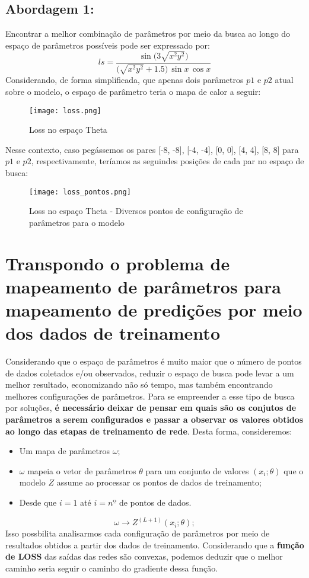 \documentclass{article}
\begin{document}
\subsection{Abordagem 1:}
Encontrar a melhor combinação de parâmetros por meio da busca ao longo do espaço de parâmetros possíveis pode ser expressado por:
\[
ls = \frac{\sin\bigl(3\sqrt{x^2 y^2}\bigr)}{\bigl(\sqrt{x^2 y^2} + 1.5\bigr)\,\sin x \,\cos x}
\]
Considerando, de forma simplificada, que apenas dois parâmetros $p1$ e $p2$ atual sobre o modelo, o espaço de parâmetro teria o mapa de calor a seguir:
\begin{figure}[H]
    \centering
    \texttt{[image: loss.png]}
    \caption{Loss no espaço Theta}
    \label{fig:enter-label}
\end{figure}
Nesse contexto, caso pegássemos os pares [-8, -8], [-4, -4], [0, 0], [4, 4], [8, 8] para $p1$ e $p2$, respectivamente, teríamos as seguindes posições de cada par no espaço de busca: 
\begin{figure}[H]
    \centering
    \texttt{[image: loss\_pontos.png]}
    \caption{Loss no espaço Theta - Diversos pontos de configuração de parâmetros para o modelo}
    \label{fig:enter-label}
\end{figure}
\section{Transpondo o problema de mapeamento de parâmetros para mapeamento de predições por meio dos dados de treinamento}
Considerando que o espaço de parâmetros é muito maior que o número de pontos de dados coletados e/ou observados, reduzir o espaço de busca pode levar a um melhor resultado, economizando não só tempo, mas também encontrando melhores configurações de parâmetros.
Para se empreender a esse tipo de busca por soluções, \textbf{é necessário deixar de pensar em quais são os conjutos de parâmetros a serem configurados e passar a observar os valores obtidos ao longo das etapas de treinamento de rede}. Desta forma, consideremos:
\begin{itemize}
    \item Um mapa de parâmetros $\omega$;
    \item $\omega$ mapeia o vetor de parâmetros $\theta$ para um conjunto de valores $(x_i; \theta)$ que o modelo $Z$ assume ao processar os pontos de dados de treinamento;
    \item Desde que $i = 1$ até $i = nº$ de pontos de dados.
\end{itemize}
\[
\omega \rightarrow Z^{(L + 1)}(x_i ; \theta);
\]
Isso possbilita analisarmos cada configuração de parâmetros por meio de resultados obtidos a partir dos dados de treinamento. Considerando que a \textbf{função de LOSS} das saídas das redes são convexas, podemos deduzir que o melhor caminho seria seguir o caminho do gradiente dessa função.
\end{document}
